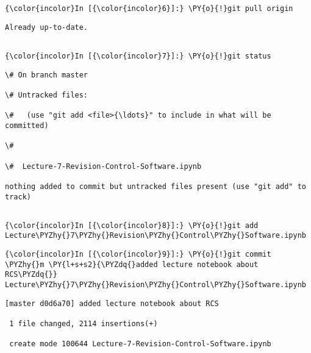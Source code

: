     \begin{Verbatim}[commandchars=\\\{\}]
{\color{incolor}In [{\color{incolor}6}]:} \PY{o}{!}git pull origin
\end{Verbatim}

    \begin{Verbatim}[commandchars=\\\{\}]
Already up-to-date.


    \end{Verbatim}







    \begin{Verbatim}[commandchars=\\\{\}]
{\color{incolor}In [{\color{incolor}7}]:} \PY{o}{!}git status
\end{Verbatim}

    \begin{Verbatim}[commandchars=\\\{\}]
\# On branch master

\# Untracked files:

\#   (use "git add <file>{\ldots}" to include in what will be committed)

\#

\#	Lecture-7-Revision-Control-Software.ipynb

nothing added to commit but untracked files present (use "git add" to track)


    \end{Verbatim}

    \begin{Verbatim}[commandchars=\\\{\}]
{\color{incolor}In [{\color{incolor}8}]:} \PY{o}{!}git add Lecture\PYZhy{}7\PYZhy{}Revision\PYZhy{}Control\PYZhy{}Software.ipynb
\end{Verbatim}

    \begin{Verbatim}[commandchars=\\\{\}]
{\color{incolor}In [{\color{incolor}9}]:} \PY{o}{!}git commit \PYZhy{}m \PY{l+s+s2}{\PYZdq{}added lecture notebook about RCS\PYZdq{}} Lecture\PYZhy{}7\PYZhy{}Revision\PYZhy{}Control\PYZhy{}Software.ipynb
\end{Verbatim}

    \begin{Verbatim}[commandchars=\\\{\}]
[master d0d6a70] added lecture notebook about RCS

 1 file changed, 2114 insertions(+)

 create mode 100644 Lecture-7-Revision-Control-Software.ipynb


    \end{Verbatim}

